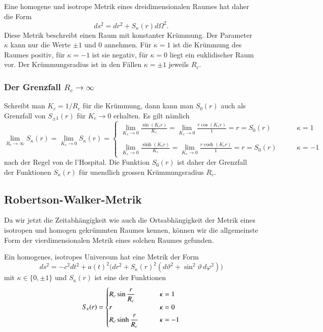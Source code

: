 Eine homogene und isotrope Metrik eines dreidimensionalen Raumes
hat daher die Form
\begin{equation}
ds^2=dr^2 + S_{\kappa}(r)d\Omega^2.
\label{skript:rwmetrik:metrikS}
\end{equation}
Diese Metrik beschreibt einen Raum mit konstanter Krümmung.
Der Parameter $\kappa$ kann nur die Werte $\pm 1$ und $0$ annehmen.
Für $\kappa=1$ ist die Krümmung des Raumes positiv, für $\kappa=-1$ ist
sie negativ, für $\kappa=0$ liegt ein euklidischer Raum vor.
Der Krümmungsradius ist in den Fällen $\kappa=\pm1$ jeweils $R_c$.

\subsubsection{Der Grenzfall $R_c\to\infty$}
Schreibt man $K_c = 1/R_c$ für die Krümmung, dann kann man $S_0(r)$
auch als Grenzfall von $S_{\pm 1}(r)$ für $K_c\to 0$ erhalten.
Es gilt  nämlich
\begin{equation}
\lim_{R_c\to\infty} S_\kappa(r)
=
\lim_{K_c\to 0} S_\kappa(r)
=\begin{cases}
\displaystyle
\lim_{K_c\to 0}\frac{\displaystyle \sin(K_cr)}{\displaystyle K_c}
=
\lim_{K_c\to 0}\frac{\displaystyle r\cos(K_cr)}{\displaystyle 1} = r = S_0(r)
&\qquad\kappa=1
\\
\\
\displaystyle
\lim_{K_c\to 0}\frac{\displaystyle \sinh(K_cr)}{\displaystyle K_c}
=
\lim_{K_c\to 0}\frac{\displaystyle r\cosh(K_cr)}{\displaystyle 1} = r = S_0(r)
&\qquad\kappa=-1
\end{cases}
\end{equation}
nach der Regel von de l'Hospital.
Die Funktion $S_0(r)$ ist daher der Grenzfall der Funktionen
$S_\kappa(r)$ für unendlich grossen Krümmungsradius $R_c$.

\subsection{Robertson-Walker-Metrik}
Da wir jetzt die Zeitabhängigkeit wie auch die Ortsabhängigkeit der
Metrik eines isotropen und homogen gekrümmten Raumes kennen, können
wir die allgemeinste Form der vierdimensionalen Metrik eines solchen
Raumes gefunden.

\begin{satz}
Ein homogenes, isotropes Universum hat eine Metrik der Form
\[
ds^2
=
-c^2 dt^2 + a(t)^2\bigl(
dr^2 + S_\kappa(r)^2(d\vartheta^2 + \sin^2\vartheta\, d\varphi^2)
\bigr)
\]
mit $\kappa\in\{0,\pm1\}$ und 
$S_\kappa(r)$ ist eine der Funktionen
\[
S_\kappa(r)
=
\begin{cases}
R_c\sin \displaystyle\frac{\mathstrut r}{R_c}&\qquad \kappa= 1\\
r&\qquad \kappa=0\\
R_c\sinh\displaystyle\frac{\mathstrut r}{R_c}&\qquad \kappa=-1
\end{cases}
\]
\end{satz}

